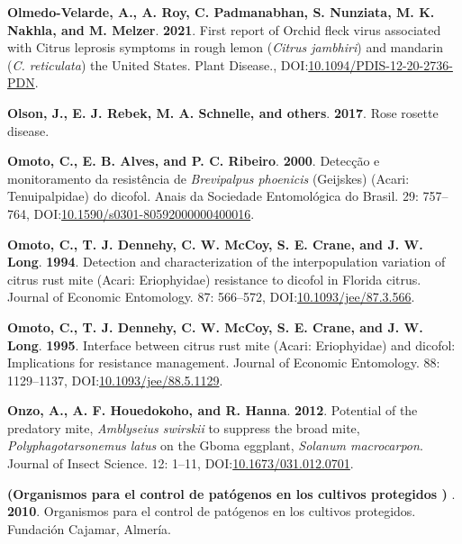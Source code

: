\documentclass[12pt,final,CPage]{ufthesis}
\newlength{\cslhangindent}
\newenvironment{CSLReferences}[2] %
{%
	\setlength{\parindent}{0pt}
	\ifodd #1 \everypar{\setlength{\hangindent}{\cslhangindent}}\ignorespaces\fi
	\ifnum #2 > 0
	\setlength{\parskip}{#2\baselineskip}
	\fi
}%
{}
\begin{document}
{\begin{CSLReferences}{1}{0}
  \leavevmode{}%
  \textbf{Olmedo-Velarde, A., A. Roy, C. Padmanabhan, S. Nunziata, M. K. Nakhla, and M. Melzer}. \textbf{2021}. First report of {Orchid fleck virus} associated with {Citrus leprosis} symptoms in rough lemon ({\emph{Citrus jambhiri}}) and mandarin ({\emph{C. reticulata}}) the {United States}. Plant Disease., DOI:\href{https://doi.org/10.1094/PDIS-12-20-2736-PDN}{10.1094/PDIS-12-20-2736-PDN}.

  \leavevmode{}%
  \textbf{Olson, J., E. J. Rebek, M. A. Schnelle, and others}. \textbf{2017}. Rose rosette disease.

  \leavevmode{}%
  \textbf{Omoto, C., E. B. Alves, and P. C. Ribeiro}. \textbf{2000}. Detec{ç}{ã}o e monitoramento da resist{ê}ncia de {\emph{Brevipalpus phoenicis}} ({Geijskes}) ({Acari}: {Tenuipalpidae}) do dicofol. Anais da Sociedade Entomol{ó}gica do Brasil. 29: 757--764, DOI:\href{https://doi.org/10.1590/s0301-80592000000400016}{10.1590/s0301-80592000000400016}.

  \leavevmode{}%
  \textbf{Omoto, C., T. J. Dennehy, C. W. McCoy, S. E. Crane, and J. W. Long}. \textbf{1994}. Detection and characterization of the interpopulation variation of citrus rust mite ({Acari}: {Eriophyidae}) resistance to dicofol in {Florida} citrus. Journal of Economic Entomology. 87: 566--572, DOI:\href{https://doi.org/10.1093/jee/87.3.566}{10.1093/jee/87.3.566}.

  \leavevmode{}%
  \textbf{Omoto, C., T. J. Dennehy, C. W. McCoy, S. E. Crane, and J. W. Long}. \textbf{1995}. Interface between citrus rust mite ({Acari}: {Eriophyidae}) and dicofol: Implications for resistance management. Journal of Economic Entomology. 88: 1129--1137, DOI:\href{https://doi.org/10.1093/jee/88.5.1129}{10.1093/jee/88.5.1129}.

  \leavevmode{}%
  \textbf{Onzo, A., A. F. Houedokoho, and R. Hanna}. \textbf{2012}. Potential of the predatory mite, {\emph{Amblyseius swirskii}} to suppress the broad mite, {\emph{Polyphagotarsonemus latus}} on the {Gboma eggplant}, {\emph{Solanum macrocarpon}}. Journal of Insect Science. 12: 1--11, DOI:\href{https://doi.org/10.1673/031.012.0701}{10.1673/031.012.0701}.

  \leavevmode{}%
  \textbf{(Organismos para el control de pat{ó}genos en los cultivos protegidos ) }. \textbf{2010}. Organismos para el control de pat{ó}genos en los cultivos protegidos. Fundaci{ó}n Cajamar, Almer{í}a.


\end{CSLReferences}}
\end{document}
